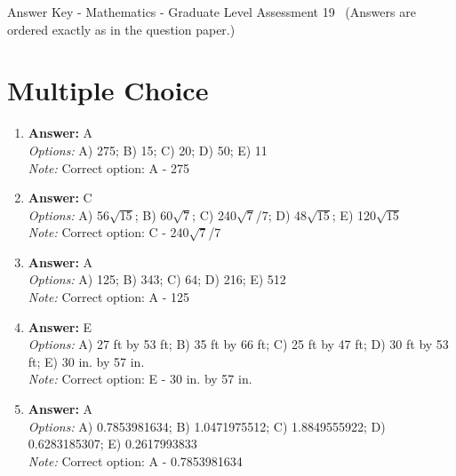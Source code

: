 \documentclass[12pt]{article}
\begin{document}
\begin{center}
Answer Key - Mathematics - Graduate Level Assessment 19 \
\small (Answers are ordered exactly as in the question paper.)
\end{center}

\section*{Multiple Choice}
\begin{enumerate}[label=\arabic*.]
\item \textbf{Answer:} A
\\ \textit{Options:} A) 275; B) 15; C) 20; D) 50; E) 11
\\ \textit{Note:} Correct option: A - 275
\item \textbf{Answer:} C
\\ \textit{Options:} A) 56\ensuremath{\sqrt{15}}; B) 60\ensuremath{\sqrt{7}}; C) 240\ensuremath{\sqrt{7}}/7; D) 48\ensuremath{\sqrt{15}}; E) 120\ensuremath{\sqrt{15}}
\\ \textit{Note:} Correct option: C - 240\ensuremath{\sqrt{7}}/7
\item \textbf{Answer:} A
\\ \textit{Options:} A) 125; B) 343; C) 64; D) 216; E) 512
\\ \textit{Note:} Correct option: A - 125
\item \textbf{Answer:} E
\\ \textit{Options:} A) 27 ft by 53 ft; B) 35 ft by 66 ft; C) 25 ft by 47 ft; D) 30 ft by 53 ft; E) 30 in. by 57 in.
\\ \textit{Note:} Correct option: E - 30 in. by 57 in.
\item \textbf{Answer:} A
\\ \textit{Options:} A) 0.7853981634; B) 1.0471975512; C) 1.8849555922; D) 0.6283185307; E) 0.2617993833
\\ \textit{Note:} Correct option: A - 0.7853981634
\end{enumerate}
\end{document}
